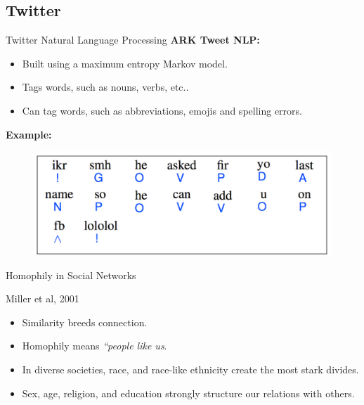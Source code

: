 \subsection{Twitter}
\begin{frame}{Twitter Natural Language Processing}
  \textbf{ARK Tweet NLP:}
  \begin{itemize}
    \item Built using a maximum entropy Markov model.
    \item Tags words, such as nouns, verbs, etc..
    \item Can tag words, such as abbreviations, emojis and spelling errors. 
  \end{itemize}
  \textbf{Example:}
  \begin{figure}[htpb]
    \centering
    \includegraphics[width=0.6\linewidth]{./images/1_nlp.pdf}
    \label{fig:nlp}
  \end{figure}
\end{frame}

\begin{frame}{Homophily in Social Networks}
  \begin{block}{Miller et al, 2001}
    \begin{itemize}
      \item Similarity breeds connection.
      \item Homophily means \textit{“people like us}.
      \item In diverse societies, race, and race-like ethnicity create the most stark divides.
      \item Sex, age, religion, and education strongly structure our relations with others.
    \end{itemize}
  \end{block}
\end{frame}
